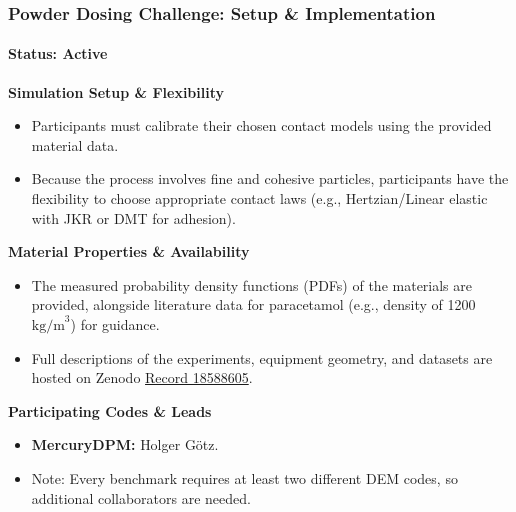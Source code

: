 \begin{frame}
\frametitle{Powder Dosing Challenge: Setup \& Implementation}
\framesubtitle{Status: Active}

    \textbf{Simulation Setup \& Flexibility}
    \begin{itemize}
        \item Participants must calibrate their chosen contact models using the provided material data. 
        \item Because the process involves fine and cohesive particles, participants have the flexibility to choose appropriate contact laws (e.g., Hertzian/Linear elastic with JKR or DMT for adhesion).
    \end{itemize}

    \textbf{Material Properties \& Availability}
    \begin{itemize}
        \item The measured probability density functions (PDFs) of the materials are provided, alongside literature data for paracetamol (e.g., density of 1200 $\text{kg/m}^3$) for guidance. 
        \item Full descriptions of the experiments, equipment geometry, and datasets are hosted on Zenodo \href{[https://zenodo.org/records/18588605](https://zenodo.org/records/18588605)}{Record 18588605}.
    \end{itemize}
    
    \textbf{Participating Codes \& Leads}
    \begin{itemize}
        \item \textbf{MercuryDPM:} \alert{Holger Götz.}
        \item \alert{Note: Every benchmark requires at least two different DEM codes, so additional collaborators are needed.} 
    \end{itemize}
\end{frame}
